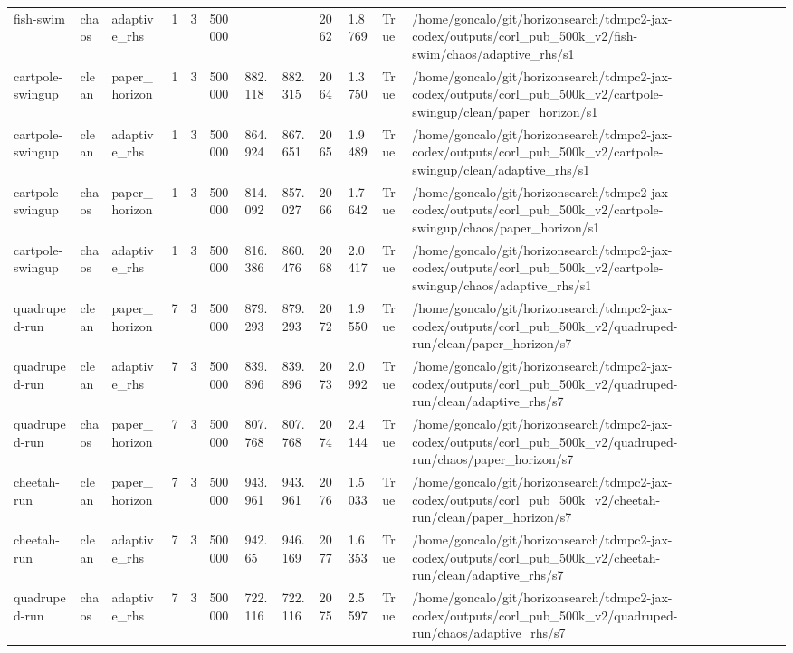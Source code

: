 \begin{tabular}{llllllllllll}
fish-swim & chaos & adaptive\_rhs & 1 & 3 & 500000 &  &  & 2062 & 1.8769 & True & /home/goncalo/git/horizonsearch/tdmpc2-jax-codex/outputs/corl\_pub\_500k\_v2/fish-swim/chaos/adaptive\_rhs/s1 \\
cartpole-swingup & clean & paper\_horizon & 1 & 3 & 500000 & 882.118 & 882.315 & 2064 & 1.3750 & True & /home/goncalo/git/horizonsearch/tdmpc2-jax-codex/outputs/corl\_pub\_500k\_v2/cartpole-swingup/clean/paper\_horizon/s1 \\
cartpole-swingup & clean & adaptive\_rhs & 1 & 3 & 500000 & 864.924 & 867.651 & 2065 & 1.9489 & True & /home/goncalo/git/horizonsearch/tdmpc2-jax-codex/outputs/corl\_pub\_500k\_v2/cartpole-swingup/clean/adaptive\_rhs/s1 \\
cartpole-swingup & chaos & paper\_horizon & 1 & 3 & 500000 & 814.092 & 857.027 & 2066 & 1.7642 & True & /home/goncalo/git/horizonsearch/tdmpc2-jax-codex/outputs/corl\_pub\_500k\_v2/cartpole-swingup/chaos/paper\_horizon/s1 \\
cartpole-swingup & chaos & adaptive\_rhs & 1 & 3 & 500000 & 816.386 & 860.476 & 2068 & 2.0417 & True & /home/goncalo/git/horizonsearch/tdmpc2-jax-codex/outputs/corl\_pub\_500k\_v2/cartpole-swingup/chaos/adaptive\_rhs/s1 \\
quadruped-run & clean & paper\_horizon & 7 & 3 & 500000 & 879.293 & 879.293 & 2072 & 1.9550 & True & /home/goncalo/git/horizonsearch/tdmpc2-jax-codex/outputs/corl\_pub\_500k\_v2/quadruped-run/clean/paper\_horizon/s7 \\
quadruped-run & clean & adaptive\_rhs & 7 & 3 & 500000 & 839.896 & 839.896 & 2073 & 2.0992 & True & /home/goncalo/git/horizonsearch/tdmpc2-jax-codex/outputs/corl\_pub\_500k\_v2/quadruped-run/clean/adaptive\_rhs/s7 \\
quadruped-run & chaos & paper\_horizon & 7 & 3 & 500000 & 807.768 & 807.768 & 2074 & 2.4144 & True & /home/goncalo/git/horizonsearch/tdmpc2-jax-codex/outputs/corl\_pub\_500k\_v2/quadruped-run/chaos/paper\_horizon/s7 \\
cheetah-run & clean & paper\_horizon & 7 & 3 & 500000 & 943.961 & 943.961 & 2076 & 1.5033 & True & /home/goncalo/git/horizonsearch/tdmpc2-jax-codex/outputs/corl\_pub\_500k\_v2/cheetah-run/clean/paper\_horizon/s7 \\
cheetah-run & clean & adaptive\_rhs & 7 & 3 & 500000 & 942.65 & 946.169 & 2077 & 1.6353 & True & /home/goncalo/git/horizonsearch/tdmpc2-jax-codex/outputs/corl\_pub\_500k\_v2/cheetah-run/clean/adaptive\_rhs/s7 \\
quadruped-run & chaos & adaptive\_rhs & 7 & 3 & 500000 & 722.116 & 722.116 & 2075 & 2.5597 & True & /home/goncalo/git/horizonsearch/tdmpc2-jax-codex/outputs/corl\_pub\_500k\_v2/quadruped-run/chaos/adaptive\_rhs/s7 \\

\end{tabular}

